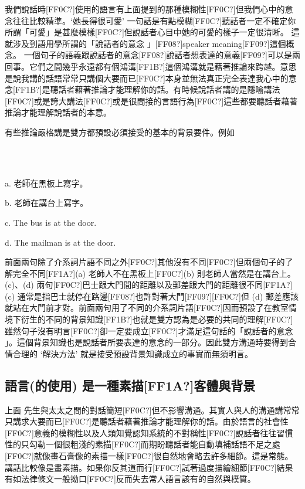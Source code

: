 我們說話時[FF0C?]使用的語言有上面提到的那種模糊性[FF0C?]但我們心中的意念往往比較精準。‘她長得很可愛' 一句話是有點模糊[FF0C?]聽話者一定不確定你所謂「可愛」是甚麼模樣[FF0C?]但說話者心目中她的可愛的樣子一定很清晰。 這就涉及到語用學所謂的「說話者的意念 」[FF08?]speaker meaning[FF09?]這個概念。 一個句子的語義跟說話者的意念[FF08?]說話者想表達的意義[FF09?]可以是兩回事。它們之間幾乎永遠都有個鴻溝[FF1B?]這個鴻溝就是藉著推論來跨越。意思是說我講的話語常常只講個大要而已[FF0C?]本身並無法真正完全表達我心中的意念[FF1B?]是聽話者藉著推論才能理解你的話。有時候說話者講的是隱喻講法[FF0C?]或是誇大講法[FF0C?]或是很間接的言語行為[FF0C?]這些都要聽話者藉著推論才能理解說話者的本意。

有些推論嚴格講是雙方都預設必須接受的基本的背景要件。例如

\ea%
\label{ex:key:13}
\gll\\
\\
\glt
\z

a.  老師在黑板上寫字。

b.  老師在講台上寫字。

c.  The bus is at the door.

d.  The mailman is at the door.

前面兩句除了介系詞片語不同之外[FF0C?]其他沒有不同[FF0C?]但兩個句子的了解完全不同[FF1A?](a) 老師人不在黑板上[FF0C?](b) 則老師人當然是在講台上。(c)、(d) 兩句[FF0C?]巴士跟大門間的距離以及郵差跟大門的距離很不同[FF1A?](c) 通常是指巴士就停在路邊[FF08?]也許對著大門[FF09?][FF0C?]但 (d) 郵差應該就站在大門前才對。前面兩句用了不同的介系詞片語[FF0C?]因而預設了在教室情境下衍生的不同的背景知識[FF1B?]也就是雙方認為是必要的共同的理解[FF0C?]雖然句子沒有明言[FF0C?]卻一定要成立[FF0C?]才滿足這句話的「說話者的意念 」。這個背景知識也是說話者所要表達的意念的一部分。因此雙方溝通時要得到合情合理的 ‘解決方法’ 就是接受預設背景知識成立的事實而無須明言。

\subsection{語言(的使用) 是一種素描[FF1A?]客體與背景} %

上面  先生與太太之間的對話簡短[FF0C?]但不影響溝通。其實人與人的溝通講常常只講求大要而已[FF0C?]是聽話者藉著推論才能理解你的話。由於語言的社會性[FF0C?]意義的模糊性以及人類知覺認知系統的不對稱性[FF0C?]說話者往往習慣性的只勾勒一個很粗淺的素描[FF0C?]而期盼聽話者能自動填補話語不足之處[FF0C?]就像畫石膏像的素描一樣[FF0C?]很自然地會略去許多細節。這是常態。講話比較像是畫素描。如果你反其道而行[FF0C?]試著過度描繪細節[FF0C?]結果有如法律條文一般拗口[FF0C?]反而失去常人語言該有的自然與樸質。

